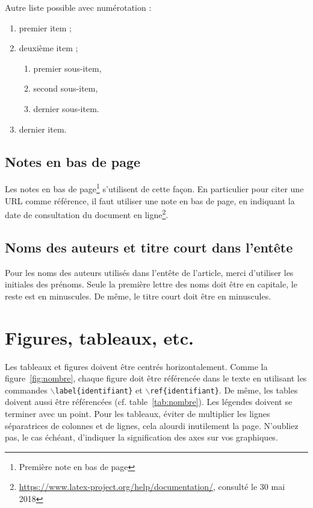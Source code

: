 \documentclass{ir}
\begin{document}
Autre liste possible avec numérotation :
\begin{enumerate}
    \item premier item ;
    \item deuxième item ;
    \begin{enumerate}
      \item premier sous-item,
      \item second sous-item,
      \item dernier sous-item.
    \end{enumerate}
  \item dernier item.
\end{enumerate}

\subsection{Notes en bas de page}

Les notes en bas de page\footnote{Première note en bas de page} s'utilisent de cette façon. En particulier pour citer une URL comme référence, il faut utiliser une note en bas de page, en indiquant la date de consultation du document en ligne\footnote{\url{https://www.latex-project.org/help/documentation/}, consulté le 30 mai 2018}.

\subsection{Noms des auteurs et titre court dans l'entête}

Pour les noms des auteurs utilisés dans l'entête de l'article, merci d'utiliser les initiales des prénoms. Seule la première lettre des noms doit être en capitale, le reste est en minuscules. De même, le titre court doit être en minuscules.

\section{Figures, tableaux, etc.}\label{sec:float}

Les tableaux et figures doivent être centrés horizontalement. Comme la figure~\ref{fig:nombre}, chaque figure doit être référencée dans le texte en utilisant les commandes \texttt{$\backslash$label\{identifiant\}} et \texttt{$\backslash$ref\{identifiant\}}. De même, les tables doivent aussi être référencées (cf. table~\ref{tab:nombre}). Les légendes doivent se terminer avec un point. Pour les tableaux, éviter de multiplier les lignes séparatrices de colonnes et de lignes, cela alourdi inutilement la page. N'oubliez pas, le cas échéant, d'indiquer la signification des axes sur vos graphiques.
\end{document}
